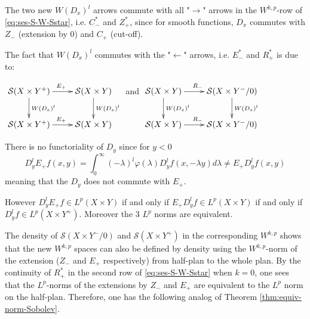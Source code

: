 The two new \(W(D_x)^l\) arrows commute with all "\(\longrightarrow\)" arrows in the \(W^{k,p}\)-row of \eqref{eq:ses-S-W-Sstar}, i.e. \(C^*_-\) and \(Z^*_+\), since for
smooth functions, \(D_x\) commutes with \(Z_-\) (extension by 0) and \(C_+\)
(cut-off).

The fact that \(W(D_x)^l\) commutes with the "\(\longleftarrow\)" arrows,
i.e. \(E^*_-\) and \(R^*_+\) is due to:

\(\xymatrix{
\mathcal{S}(X\times Y^+) \ar@{->}[d]^{W(D_x)^l} \ar@{->}[r]^{E_+} & \mathcal{S}(X\times Y) \ar@{->}[d]^{W(D_x)^l} \\
\mathcal{S}(X\times Y^+) \ar@{->}[r]^{E_+} & \mathcal{S}(X\times Y)
}\)
and
\(\xymatrix{
\mathcal{S}(X\times Y) \ar@{->}[d]^{W(D_x)^l} \ar@{->}[r]^{R_-} & \mathcal{S}(X\times Y^-/0) \ar@{->}[d]^{W(D_x)^l} \\
\mathcal{S}(X\times Y) \ar@{->}[r]^{R_-} & \mathcal{S}(X\times Y^-/0)
}\)

\begin{remark}
\label{rem:funct-Dy}
There is no functoriality of \(D_y\) since for \(y<0\)
\[
 D_y^l E_+ f(x,y) = \int_0^\infty (-\lambda)^l \varphi(\lambda)D_y^l f(x,-\lambda
y)d\lambda \ne E_+ D_y^l f(x,y)
\]
meaning that the \(D_y\) does not commute with \(E_+\).

However \(D_y^l E_+ f\in L^p(X\times Y)\) if and only if \(E_+ D^l_y f\in L^p(X\times
Y)\) if and only if \(D^l_y f  \in L^p(X\times Y^+)\). Moreover the 3 \(L^p\) norms
are equivalent.
\end{remark}


The density of \(\mathcal{S}(X\times Y^-/0)\) and \(\mathcal{S}(X\times Y^+)\) in the
corresponding \(W^{k,p}\) shows that the new \(W^{k,p}\) spaces can also be defined by
density using the \(W^{k,p}\)-norm of the extension (\(Z_-\) and \(E_+\) respectively) from half-plan to the whole plan. By the continuity of \(R_+^*\) in the second row of \eqref{eq:ses-S-W-Sstar} when \(k=0\), one sees that
the \(L^p\)-norms of the extensions by \(Z_-\) and \(E_+\) are equivalent to the \(L^p\) norm on the half-plan. Therefore, one has the following analog of Theorem \ref{thm:equiv-norm-Sobolev}.

